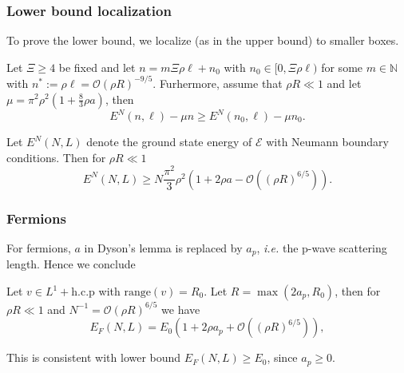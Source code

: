 \documentclass{beamer}[10]
\newcommand{\ie}{\emph{i.e.} }
\begin{document}
\begin{frame}
	\frametitle{Lower bound localization}
	\begin{block}{}
	\small	To prove the lower bound, we localize (as in the upper bound) to smaller boxes.
		\begin{lemma}\label{LemmaLocalizationFbound}
			Let $ \Xi\geq 4 $ be fixed and let $ n=m\Xi \rho \ell+n_0 $ with $ n_0\in[0,\Xi\rho \ell) $ for some $ m\in\mathbb{N} $ with $ n^{\ast}:=\rho\ell=\mathcal{O}(\rho R)^{-9/5} $. Furhermore, assume that $ \rho R\ll 1 $ and let $ \mu=\pi^2\rho^2\left(1+\frac{8}{3}\rho a\right) $, then \begin{equation}
			E^{N}(n,\ell)-\mu n \geq E^{N}(n_0,\ell)-\mu n_0.
			\end{equation}
		\end{lemma}
		\begin{theorem} Let $ E^N(N,L) $ denote the ground state energy of $ \mathcal{E} $ with Neumann boundary conditions. Then for $ \rho R \ll 1 $
			\begin{equation}
			E^N(N,L)\geq N\frac{\pi^2}{3}\rho^2\left(1+2\rho a-\mathcal{O}\left((\rho R)^{6/5}\right)\right).
			\end{equation}
		\end{theorem}
	\end{block}	
\end{frame}
\begin{frame}
	\frametitle{Fermions}
	For fermions, $ a $ in Dyson's lemma is replaced by $ a_p $, \ie the p-wave scattering length. Hence we conclude
	\begin{theorem}[Fermions]
		Let $ v\in L^{1}+\text{h.c.p} $ with $ \text{range}(v)=R_0 $. Let $ R=\max(2 a_p,R_0) $, then for $ \rho R\ll 1  $ and $ N^{-1}=\mathcal{O}(\rho R)^{6/5} $ we have \begin{equation}
		E_F(N,L)=E_0\left(1+2\rho a_p+ \mathcal{O}\left((\rho R)^{6/5}\right)\right),
		\end{equation} 
	\end{theorem}
	This is consistent with lower bound $ E_F(N,L)\geq E_0 $, since $ a_p\geq 0 $.
\end{frame}

\begin{frame}
\end{frame}
\end{document}
